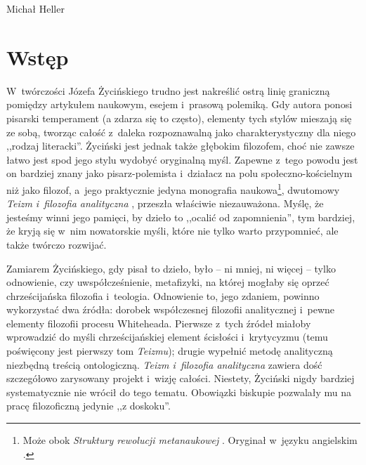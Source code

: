 \begin{artplenv}{Michał Heller}
\section{Wstęp}
\lettrine[loversize=0.13,lines=2,lraise=-0.01,nindent=0em,findent=0.2pt]%
{W}{}~twórczości Józefa Życińskiego trudno jest nakreślić ostrą linię graniczną pomiędzy artykułem naukowym, esejem i~prasową polemiką. Gdy autora ponosi pisarski temperament (a zdarza się to często), elementy tych stylów mieszają się ze sobą, tworząc całość z~daleka rozpoznawalną jako charakterystyczny dla niego ,,rodzaj literacki''. Życiński jest jednak także głębokim filozofem, choć nie zawsze łatwo jest spod jego stylu wydobyć oryginalną myśl. Zapewne z~tego powodu jest on bardziej znany jako pisarz-polemista i~działacz na polu społeczno-kościelnym niż jako filozof, a~jego praktycznie jedyna monografia naukowa\footnote{Może obok \textit{Struktury rewolucji metanaukowej}
\parencite[][]{zycinski_struktura_2013}. %
 Oryginał w~języku angielskim 
\parencite[][]{zycinski_structure_1988}.%
}, dwutomowy \textit{Teizm i~filozofia analityczna} 
\parencites{zycinski_teizm_1985}[][]{zycinski_teizm_1988}, %
 przeszła właściwie niezauważona. Myślę, że jesteśmy winni jego pamięci, by dzieło to ,,ocalić od zapomnienia'', tym bardziej, że kryją się w~nim nowatorskie myśli, które nie tylko warto przypomnieć, ale także twórczo rozwijać.

Zamiarem Życińskiego, gdy pisał to dzieło, było -- ni mniej, ni więcej -- tylko odnowienie, czy uwspółcześnienie, metafizyki, na której mogłaby się oprzeć chrześcijańska filozofia i~teologia. Odnowienie to, jego zdaniem, powinno wykorzystać dwa źródła: dorobek współczesnej filozofii analitycznej i~pewne elementy filozofii procesu Whiteheada. Pierwsze z~tych źródeł miałoby wprowadzić do myśli chrześcijańskiej element ścisłości i~krytycyzmu (temu poświęcony jest pierwszy tom \textit{Teizmu}); drugie wypełnić metodę analityczną niezbędną treścią ontologiczną. \textit{Teizm i~filozofia analityczna} zawiera dość szczegółowo zarysowany projekt i~wizję całości. Niestety, Życiński nigdy bardziej systematycznie nie wrócił do tego tematu. Obowiązki biskupie pozwalały mu na pracę filozoficzną jedynie ,,z doskoku''.


\end{artplenv}
